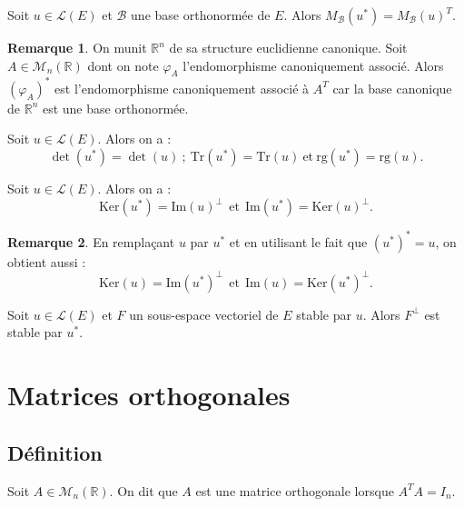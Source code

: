 \documentclass[french]{article}
\newcommand{\R}{\mathbb{R}}
\newcommand{\st}{^*}
\renewcommand{\ker}{\text{Ker}}
\newcommand{\Tr}{\text{Tr}}
\newcommand{\rg}{\text{rg}}
\theoremstyle{plain}
\theoremstyle{definition}
\newtheorem*{rmq}{Remarque}
\theoremstyle{remark}
\begin{document}
\begin{prop}
	Soit $u\in\mathcal{L}(E)$ et $\mathcal{B}$ une base orthonormée de $E$. Alors $M_\mathcal{B}(u\st)=M_\mathcal{B}(u)^T$.
\end{prop}

\begin{rmq}
	On munit $\R^n$ de sa structure euclidienne canonique. Soit $A\in\mathcal{M}_n(\R)$ dont on note $\varphi_A$ l'endomorphisme canoniquement associé. Alors $(\varphi_A)\st$ est l'endomorphisme canoniquement associé à $A^T$ car la base canonique de $\R^n$ est une base orthonormée.
\end{rmq}

\begin{cor}
	Soit $u\in\mathcal{L}(E)$. Alors on a : $$\det(u\st)=\det(u)\ ; \ \Tr(u\st)=\Tr(u)\ \text{et}\ \rg(u\st)=\rg(u).$$
\end{cor}

\begin{prop}
	Soit $u\in\mathcal{L}(E)$. Alors on a : $$\ker(u\st)=\text{Im}(u)^\bot \ \ \text{et} \ \ \text{Im}(u\st)=\ker(u)^\bot.$$
\end{prop}

\begin{rmq}
	En remplaçant $u$ par $u\st$ et en utilisant le fait que $(u\st)\st=u$, on obtient aussi : $$\ker(u)=\text{Im}(u\st)^\bot \ \ \text{et} \ \ \text{Im}(u)=\ker(u\st)^\bot.$$
\end{rmq}

\begin{lem}
	Soit $u\in\mathcal{L}(E)$ et $F$ un sous-espace vectoriel de $E$ stable par $u$. Alors $F^\bot$ est stable par $u\st$.
\end{lem}

\section{Matrices orthogonales}

\subsection{Définition}

\begin{dfn}
	Soit $A\in\mathcal{M}_n(\R)$. On dit que $A$ est une matrice orthogonale lorsque $A^TA=I_n$.
\end{dfn}
\end{document}
